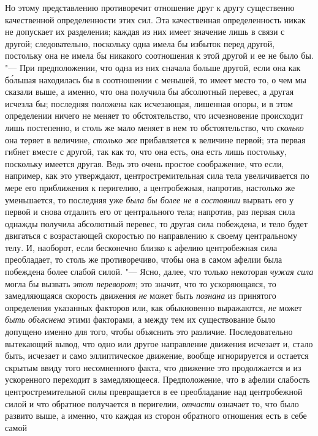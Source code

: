 Но этому представлению противоречит отношение друг к другу существенно
качественной определенности этих сил. Эта качественная определенность никак
не допускает их разделения; каждая из них имеет значение лишь в связи с
другой; следовательно, поскольку одна имела бы избыток перед другой,
постольку она не имела бы никакого соотношения к этой другой и ее не было
бы. "--- При предположении, что одна из них сначала больше другой, если она
как б\'{о}льшая находилась бы в соотношении с меньшей, то имеет место то, о чем
мы сказали выше, а именно, что она получила бы абсолютный перевес, а другая
исчезла бы; последняя положена как исчезающая, лишенная опоры, и в этом
определении ничего не меняет то обстоятельство, что исчезновение происходит
лишь постепенно, и столь же мало меняет в нем то обстоятельство, что
{\em сколько} она теряет в величине,
{\em столько же} прибавляется к величине первой; эта
первая гибнет вместе с другой, так как то, что она есть, она есть лишь
постольку, поскольку имеется другая. Ведь это очень простое соображение,
что если, например, как это утверждают, центростремительная сила тела
увеличивается по мере его приближения к перигелию, а центробежная,
напротив, настолько же уменьшается, то последняя уже
{\em была бы более не в состоянии} вырвать его у первой
и снова отдалить его от центрального тела; напротив, раз первая сила
однажды получила абсолютный перевес, то другая сила побеждена, и тело будет
двигаться с возрастающей скоростью по направлению к своему центральному
телу. И, наоборот, если бесконечно близко к афелию центробежная сила
преобладает, то столь же противоречиво, чтобы она в самом афелии была
побеждена более слабой силой. "--- Ясно, далее, что только некоторая
{\em чужая сила} могла бы вызвать
{\em этот переворот}; это значит, что то ускоряющаяся,
то замедляющаяся скорость движения {\em не} может быть
{\em познана} из принятого определения указанных
факторов или, как обыкновенно выражаются, {\em не}
может {\em быть объяснена} этими факторами, а между тем
их существование было допущено именно для того, чтобы объяснить это
различие. Последовательно вытекающий вывод, что одно или другое направление
движения исчезает и, стало быть, исчезает и само эллиптическое движение,
вообще игнорируется и остается скрытым ввиду того несомненного факта, что
движение это продолжается и из ускоренного переходит в замедляющееся.
Предположение, что в афелии слабость центростремительной силы превращается
в ее преобладание над центробежной силой и что обратное получается в
перигелии, {\em отчасти} означает то, что было развито
выше, а именно, что каждая из сторон обратного отношения есть в себе самой
